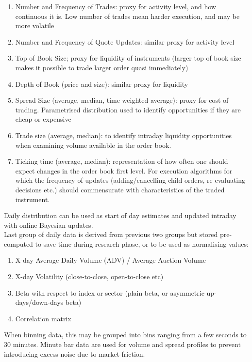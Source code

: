 \documentclass[a4paper,oneside,openany]{book}
\begin{document}
\begin{definition} 
\begin{enumerate}[label=\roman*.]
\setlength{\itemsep}{0pt}
\item Number and Frequency of Trades: proxy for activity level, and how continuous it is. Low number of trades mean harder execution, and may be more volatile
\item Number and Frequency of Quote Updates: similar proxy for activity level
\item Top of Book Size; proxy for liquidity of instruments (larger top of book size makes it possible to trade larger order quasi immediately)
\item Depth of Book (price and size): similar proxy for liquidity
\item Spread Size (average, median, time weighted average): proxy for cost of trading. Parametrised distribution used to identify opportunities if they are cheap or expensive
\item Trade size (average, median): to identify intraday liquidity opportunities when examining volume available in the order book.
\item Ticking time (average, median): representation of how often one should expect changes in the order book first level. For execution algorithms for which the frequency of updates (adding/cancelling child orders, re-evaluating decisions etc.) should commensurate with characteristics of the traded instrument.
\end{enumerate}
Daily distribution can be used as start of day estimates and updated intraday with online Bayesian updates.\\
Last group of daily data is derived from previous two groups but stored pre-computed to save time during research phase, or to be used as normalising values:
\begin{enumerate}[label=\roman*.]
\setlength{\itemsep}{0pt}
\item X-day Average Daily Volume (ADV) / Average Auction Volume
\item X-day Volatility (close-to-close, open-to-close etc)
\item Beta with respect to index or sector (plain beta, or asymmetric up-days/down-days beta)
\item Correlation matrix
\end{enumerate}
When binning data, this may be grouped into bins ranging from a few seconds to 30 minutes. Minute bar data are used for volume and spread profiles to prevent introducing excess noise due to market friction.
\end{definition}
\end{document}
